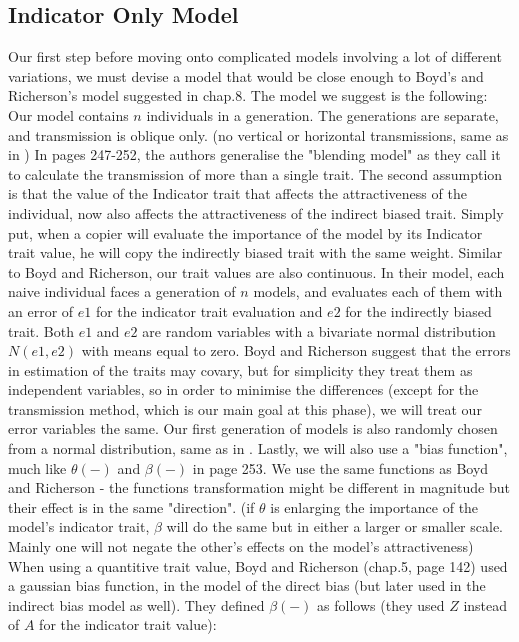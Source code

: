 \documentclass[11pt]{article}
\begin{document}
\subsection{Indicator Only Model}
Our first step before moving onto complicated models involving a lot of different variations, we must devise a model that would be close enough to Boyd's and Richerson's model suggested in \cite{evolutionBook} chap.8. The model we suggest is the following:
Our model contains $n$ individuals in a generation. The generations are separate, and transmission is oblique only. (no vertical or horizontal transmissions, same as in \cite{evolutionBook})
In \cite{evolutionBook} pages 247-252, the authors generalise the "blending model" as they call it to calculate the transmission of more than a single trait. The second assumption is that the value of the Indicator trait that affects the attractiveness of the individual, now also affects the attractiveness of the indirect biased trait. Simply put, when a copier will evaluate the importance of the model by its Indicator trait value, he will copy the indirectly biased trait with the same weight. Similar to Boyd and Richerson, our trait values are also continuous. In their model, each naive individual faces a generation of $n$ models, and evaluates each of them with an error of $e1$ for the indicator trait evaluation and $e2$ for the indirectly biased trait. Both $e1$ and $e2$ are random variables with a bivariate normal distribution $N(e1,e2)$ with means equal to zero. Boyd and Richerson suggest that the errors in estimation of the traits may covary, but for simplicity they treat them as independent variables, so in order to minimise the differences (except for the transmission method, which is our main goal at this phase), we will treat our error variables the same. Our first generation of models is also randomly chosen from a normal distribution, same as in \cite{evolutionBook}. Lastly, we will also use a "bias function", much like $\theta(-)$ and $\beta(-)$ in \cite{evolutionBook} page 253. We use the same functions as Boyd and Richerson - the functions transformation might be different in magnitude but their effect is in the same "direction". (if $\theta$ is enlarging the importance of the model's indicator trait, $\beta$ will do the same but in either a larger or smaller scale. Mainly one will not negate the other's effects on the model's attractiveness)
When using a quantitive trait value, Boyd and Richerson (chap.5, page 142) used a gaussian bias function, in the model of the direct bias (but later used in the indirect bias model as well). They defined $\beta(-)$ as follows (they used $Z$ instead of $A$ for the indicator trait value):
\end{document}
